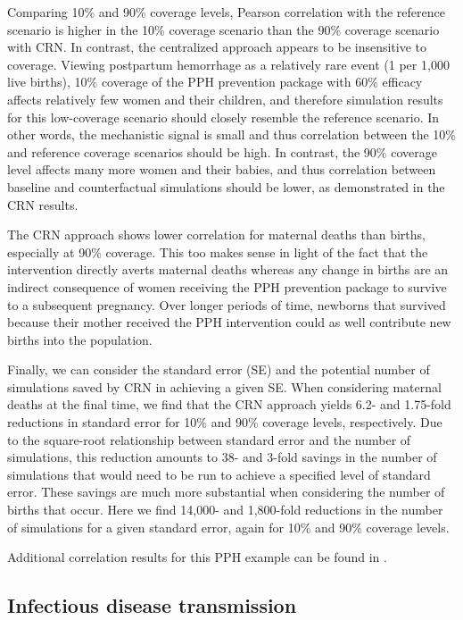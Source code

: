 \documentclass[10pt,letterpaper]{article}
\begin{document}
Comparing 10\% and 90\% coverage levels, Pearson correlation with the reference scenario is higher in the 10\% coverage scenario than the 90\% coverage scenario with CRN. In contrast, the centralized approach appears to be insensitive to coverage. Viewing postpartum hemorrhage as a relatively rare event (1 per 1,000 live births), 10\% coverage of the PPH prevention package with 60\% efficacy affects relatively few women and their children, and therefore simulation results for this low-coverage scenario should closely resemble the reference scenario. In other words, the mechanistic signal is small and thus correlation between the 10\% and reference coverage scenarios should be high. In contrast, the 90\% coverage level affects many more women and their babies, and thus correlation between baseline and counterfactual simulations should be lower, as demonstrated in the CRN results.

The CRN approach shows lower correlation for maternal deaths than births, especially at 90\% coverage. This too makes sense in light of the fact that the intervention directly averts maternal deaths whereas any change in births are an indirect consequence of women receiving the PPH prevention package to survive to a subsequent pregnancy. Over longer periods of time, newborns that survived because their mother received the PPH intervention could as well contribute new births into the population.

Finally, we can consider the standard error (SE) and the potential number of simulations saved by CRN in achieving a given SE. When considering maternal deaths at the final time, we find that the CRN approach yields 6.2- and 1.75-fold reductions in standard error for 10\% and 90\% coverage levels, respectively. Due to the square-root relationship between standard error and the number of simulations, this reduction amounts to 38- and 3-fold savings in the number of simulations that would need to be run to achieve a specified level of standard error. These savings are much more substantial when considering the number of births that occur. Here we find 14,000- and 1,800-fold reductions in the number of simulations for a given standard error, again for 10\% and 90\% coverage levels.

Additional correlation results for this PPH example can be found in .

\subsection*{Infectious disease transmission}
\end{document}
